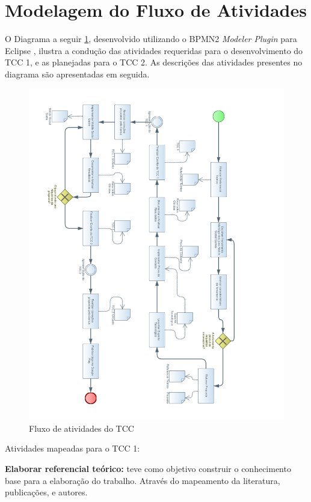 \section{Modelagem do Fluxo de Atividades}
\label{sec:modelagem}

O Diagrama a seguir \ref{figura:diagram}, desenvolvido utilizando o BPMN2
\textit{Modeler Plugin} para Eclipse \cite{eclipse}, ilustra a condução das atividades
requeridas para o desenvolvimento do TCC 1, e as planejadas para o TCC 2. As
descrições das atividades presentes no diagrama são apresentadas em seguida.


\begin{figure}[H]
  \centering
  \includegraphics[width=16cm]{figuras/diagram}
  \caption{Fluxo de atividades do TCC}
  \label{figura:diagram}
\end{figure}

Atividades mapeadas para o TCC 1:

\textbf{Elaborar referencial teórico:} teve como objetivo construir o conhecimento
base para a elaboração do trabalho. Através do mapeamento da literatura, publicações,
e autores.

